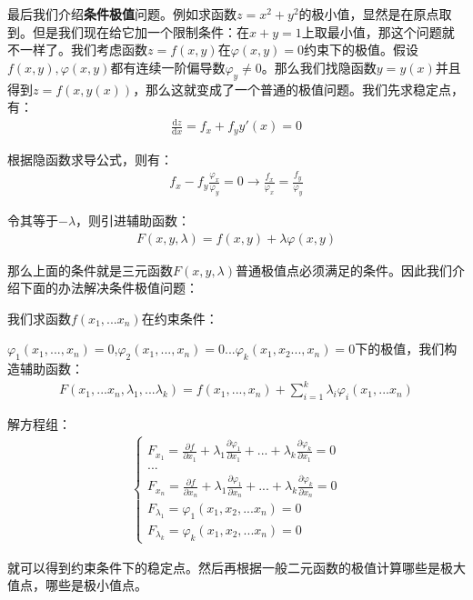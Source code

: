 \documentclass{ctexart}
\let\oldtextbf\textbf %
\renewcommand{\textbf}[1]{\textcolor{btex}{\oldtextbf{#1}}} %
\begin{document}
最后我们介绍\textbf{条件极值}问题。例如求函数$z=x^2+y^2$的极小值，显然是在原点取到。但是我们现在给它加一个限制条件：在$x+y=1$上取最小值，那这个问题就不一样了。我们考虑函数$z=f(x,y)$在$\varphi(x,y)=0$约束下的极值。假设$f(x,y),\varphi(x,y)$都有连续一阶偏导数$\varphi_y\neq 0$。那么我们找隐函数$y=y(x)$并且得到$z=f(x,y(x))$，那么这就变成了一个普通的极值问题。我们先求稳定点，有：
\begin{align*}
    \frac{\mathrm{d}z}{\mathrm{d}x}=f_x+f_yy'(x)=0
\end{align*}

根据隐函数求导公式，则有：
\begin{align*}
    f_x-f_y\frac{\varphi_x}{\varphi_y}=0\to \frac{f_x}{\varphi_x}=\frac{f_y}{\varphi_y}
\end{align*}

令其等于$-\lambda$，则引进辅助函数：
\begin{align*}
    F(x,y,\lambda)=f(x,y)+\lambda \varphi(x,y)
\end{align*}

那么上面的条件就是三元函数$F(x,y,\lambda)$普通极值点必须满足的条件。因此我们介绍下面的办法解决条件极值问题：

\begin{tcolorbox}[
    colback=bac1,     %
    colframe=fra1,   %
    coltitle=white,             %
    coltext=tex1,
    title=拉格朗日乘子法,
    fonttitle=\bfseries,        %
arc=3mm,                     %
breakable
]
我们求函数$f(x_1,...x_n)$在约束条件：

$\varphi_1(x_1,...,x_n)=0$,$\varphi_2(x_1,...,x_n)=0$...$\varphi_k(x_1,x_2...,x_n)=0$下的极值，我们构造辅助函数：
\begin{align*}
F(x_1,...x_n,\lambda_1,...\lambda_k)=f(x_1,...,x_n)+\sum_{i=1}^k\lambda_i\varphi_i(x_1,...x_n)\tag{7-22}
\end{align*}

解方程组：
\begin{align*}
    \begin{cases}
        F_{x_1}=\frac{\partial f}{\partial x_1}+\lambda_1\frac{\partial \varphi_1}{\partial x_1}+
...+\lambda_k\frac{\partial \varphi_k}{\partial x_1}=0  \\
...\\
    F_{x_n}=\frac{\partial f}{\partial x_n}+\lambda_1\frac{\partial \varphi_1}{\partial x_n}+
...+\lambda_k\frac{\partial \varphi_k}{\partial x_n}=0 \\
F_{\lambda_1}=\varphi_1(x_1,x_2,...x_n)=0\\
F_{\lambda_k}=\varphi_k(x_1,x_2,...x_n)=0
    \end{cases}\tag{7-23}
\end{align*}

就可以得到约束条件下的稳定点。然后再根据一般二元函数的极值计算哪些是极大值点，哪些是极小值点。
\end{tcolorbox}
\end{document}
